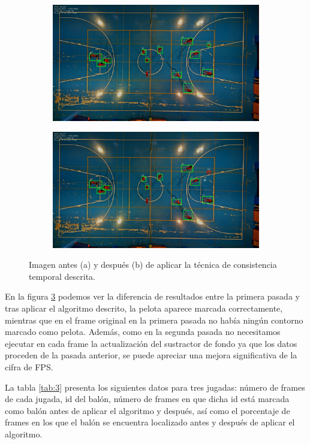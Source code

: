 \begin{figure}
\begin{subfigure}{.5\textwidth}
  \centering
  \includegraphics[width=.9\linewidth]{images/noconsistencia}
  \caption { }
  \label{fig:consa}
\end{subfigure}%
\begin{subfigure}{.5\textwidth}
  \centering
  \includegraphics[width=.9\linewidth]{images/consistencia}
  \caption { }
  \label{fig:consb}
\end{subfigure}
\caption{Imagen antes (a) y después (b) de aplicar la técnica de consistencia temporal descrita.}
\label{fig:cons}
\end{figure}

En la figura \ref{fig:cons} podemos ver la diferencia de resultados entre la primera pasada y tras aplicar el algoritmo descrito, la pelota aparece marcada correctamente, mientras que en el frame original en la primera pasada no había ningún contorno marcado como pelota. Además, como en la segunda pasada no necesitamos ejecutar en cada frame la actualización del sustractor de fondo ya que los datos proceden de la pasada anterior, se puede apreciar una mejora significativa de la cifra de FPS.

La tabla \ref{tab:3} presenta los siguientes datos para tres jugadas: número de frames de cada jugada, id del balón, número de frames en que dicha id está marcada como balón antes de aplicar el algoritmo y después, así como el porcentaje de frames en los que el balón se encuentra localizado antes y después de aplicar el algoritmo.


